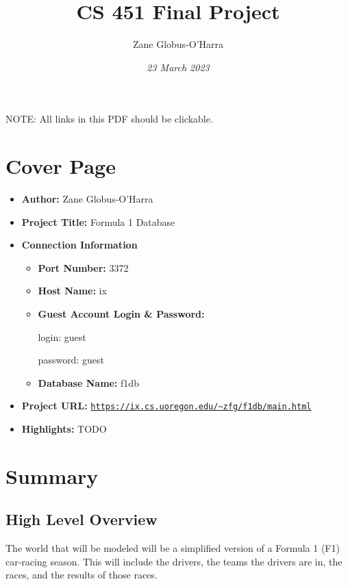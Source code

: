 \documentclass{article} %
\title{CS 451 Final Project}
\author{Zane Globus-O'Harra}
\date{\textit{23 March 2023}}
\begin{document}
\maketitle

\tableofcontents

NOTE: All links in this PDF should be clickable.
\newpage

\section{Cover Page}

\begin{itemize}
    \item \textbf{Author:} Zane Globus-O'Harra
    
    \item \textbf{Project Title:} Formula 1 Database

    \item \textbf{Connection Information}
    \begin{itemize}
        \item \textbf{Port Number:} 3372

        \item \textbf{Host Name:} ix

        \item \textbf{Guest Account Login \& Password:} 

        login: guest 

        password: guest 

        \item \textbf{Database Name:} f1db

    \end{itemize}

    \item \textbf{Project URL:}
    \href{https://ix.cs.uoregon.edu/~zfg/f1db/main.html}{\texttt{https://ix.cs.uoregon.edu/\~{}zfg/f1db/main.html}}

    \item \textbf{Highlights:} TODO
\end{itemize}

\section{Summary}

\subsection{High Level Overview}
The world that will be modeled will be a simplified version of a Formula
1 (F1) car-racing season. This will include the drivers, the teams the
drivers are in, the races, and the results of those races. 
\end{document}
